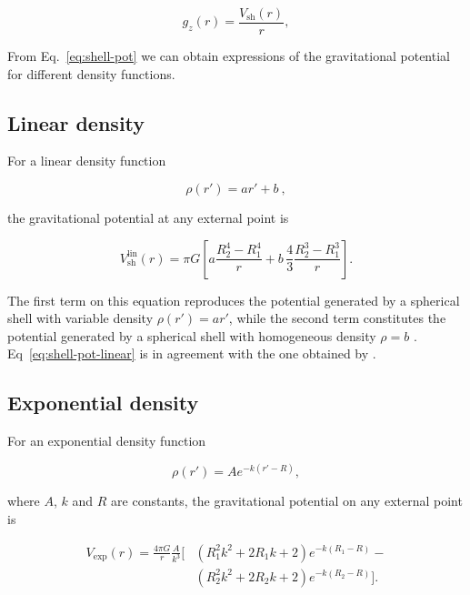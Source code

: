 \documentclass[extra, referee]{gji}
\begin{document}
\begin{equation}
    g_z(r) = \frac{V_\text{sh}(r)}{r},
\label{eq:shell-gz}
\end{equation}

From Eq.~\ref{eq:shell-pot} we can obtain expressions of the gravitational potential for
different density functions.

\subsection{Linear density}

For a linear density function

\begin{equation}
    \rho(r') = ar' + b\ ,
\end{equation}

\noindent
the gravitational potential at any external point is

\begin{equation}
    V_\text{sh}^\text{lin}(r) = \pi G \left[
    a \frac{R_2^4 - R_1^4}{r} +
    b \,\frac{4}{3} \frac{R_2^3 - R_1^3}{r} \right].
    \label{eq:shell-pot-linear}
\end{equation}

\noindent The first term on this equation reproduces the potential generated
by a spherical shell with variable density $\rho(r') = ar'$, while the second
term constitutes the potential generated by a spherical shell with homogeneous
density $\rho = b$ \citep{Mikuska2006,Grombein2013}.
Eq~\ref{eq:shell-pot-linear} is in agreement with the one obtained by \citet{Lin2018}.

\subsection{Exponential density}

For an exponential density function

\begin{equation}
    \rho(r') = A e^{- k (r' - R)},
\end{equation}

\noindent
where $A$, $k$ and $R$ are constants, the gravitational potential on any external point
is

\begin{equation}
    \begin{split}
    V_\text{exp}(r) = \frac{4\pi G}{r} \frac{A}{k^3} \Big[
    & \left( R_1^2 k^2 + 2 R_1 k + 2 \right) e^{- k (R_1 - R)} - \\
    & \left( R_2^2 k^2 + 2 R_2 k + 2 \right) e^{- k (R_2 - R)}
    \Big].
    \end{split}
\end{equation}
\end{document}
